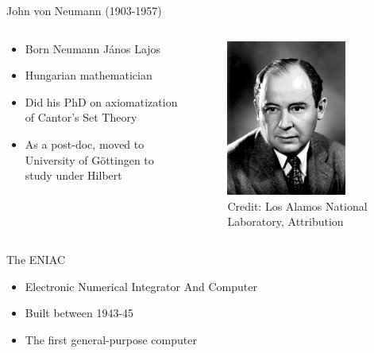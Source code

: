 \documentclass[utf8]{beamer}
\begin{document}
\begin{frame}{John von Neumann (1903-1957)}
\begin{columns}
\begin{column}{0.6\textwidth}
\begin{itemize}
\item Born Neumann J{\'a}nos Lajos
\item Hungarian mathematician
\item Did his PhD on axiomatization of Cantor's Set Theory
\item As a post-doc, moved to University of G{\"o}ttingen to study under Hilbert
\end{itemize}
\end{column}
\begin{column}{0.4\textwidth}
\begin{figure}
\centering
\includegraphics[width=0.8\textwidth]{images/vonneumann.jpg}
\\
\tiny Credit: Los Alamos National Laboratory, Attribution
\end{figure}
\end{column}
\end{columns}
\end{frame}

\begin{frame}{The ENIAC}
\begin{itemize}
\item Electronic Numerical Integrator And Computer
\item Built between 1943-45
\item The first general-purpose computer
\end{itemize}
\end{frame}
\end{document}
